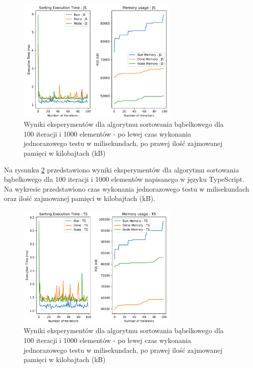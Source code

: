 \begin{figure}[H]
  \centering
  \includegraphics[width=0.7\textwidth]{Figures/sorting/sorting_bubble_100_1000_js.png}
  \caption{Wyniki eksperymentów dla algorytmu sortowania bąbelkowego dla 100 iteracji i 1000 elementów - po lewej czas wykonania jednorazowego testu w milisekundach, po prawej ilość zajmowanej pamięci w kilobajtach (kB)}
  \label{fig:bubble_sorting_e1}
\end{figure}

Na rysunku \ref{fig:bubble_sorting_e1_ts} przedstawiono wyniki eksperymentów dla algorytmu sortowania bąbelkowego dla 100 iteracji i 1000 elementów napisanego w języku TypeScript. Na wykresie przedstawiono czas wykonania jednorazowego testu w milisekundach oraz ilość zajmowanej pamięci w kilobajtach (kB).

\begin{figure}[H]
  \centering
  \includegraphics[width=0.7\textwidth]{Figures/sorting/sorting_bubble_100_1000_ts.png}
  \caption{Wyniki eksperymentów dla algorytmu sortowania bąbelkowego dla 100 iteracji i 1000 elementów - po lewej czas wykonania jednorazowego testu w milisekundach, po prawej ilość zajmowanej pamięci w kilobajtach (kB)}
  \label{fig:bubble_sorting_e1_ts}
\end{figure}

